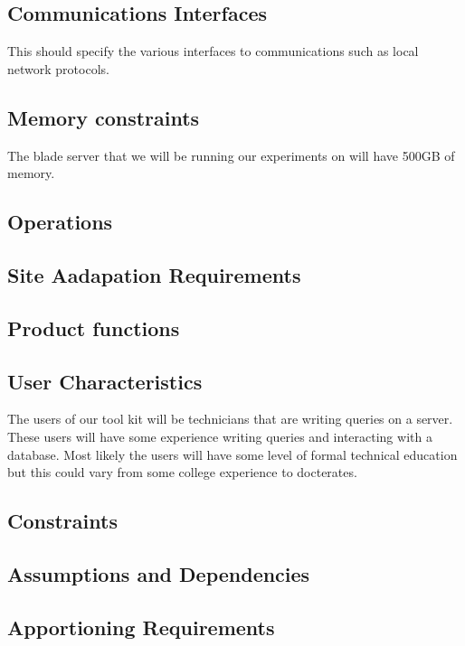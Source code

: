 \documentclass[draftclsnofoot, onecolumn, 10pt]{IEEEtran}
\begin{document}
\subsection{Communications Interfaces}
This should specify the various interfaces to communications such as local network protocols.

\subsection{Memory constraints}
The blade server that we will be running our experiments on will have 500GB of memory. 

\subsection{Operations}

\subsection{Site Aadapation Requirements}

\subsection{Product functions}

\subsection{User Characteristics}
The users of our tool kit will be technicians that are writing queries on a server. These users will have some experience writing queries and interacting with a database. Most likely the users will have some level of formal technical education but this could vary from some college experience to docterates.  

\subsection{Constraints}

\subsection{Assumptions and Dependencies}

\subsection{Apportioning Requirements}
\end{document}
